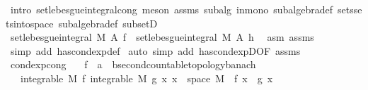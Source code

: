 \begin{isabellebody}
\ {\isacharparenleft}{\kern0pt}intro\ set{\isacharunderscore}{\kern0pt}lebesgue{\isacharunderscore}{\kern0pt}integral{\isacharunderscore}{\kern0pt}cong{\isacharparenright}{\kern0pt}\ {\isacharparenleft}{\kern0pt}meson\ assms{\isacharparenleft}{\kern0pt}{}{\isacharparenright}{\kern0pt}\ subalg\ in{\isacharunderscore}{\kern0pt}mono\ subalgebra{\isacharunderscore}{\kern0pt}def\ sets{\isachardot}{\kern0pt}sets{\isacharunderscore}{\kern0pt}into{\isacharunderscore}{\kern0pt}space\ subalgebra{\isacharunderscore}{\kern0pt}def\ subsetD{\isacharparenright}{\kern0pt}{\isacharplus}{\kern0pt}\isanewline
\ \ \isamarkupfalse%
\ {\isachardoublequoteopen}set{\isacharunderscore}{\kern0pt}lebesgue{\isacharunderscore}{\kern0pt}integral\ M\ A\ f\ {\isacharequal}{\kern0pt}\ set{\isacharunderscore}{\kern0pt}lebesgue{\isacharunderscore}{\kern0pt}integral\ M\ A\ h{\isachardoublequoteclose}\ \isamarkupfalse%
\ asm\ assms{\isacharparenleft}{\kern0pt}{}{\isacharparenright}{\kern0pt}\ \isamarkupfalse%
\ {\isacharparenleft}{\kern0pt}simp\ add{\isacharcolon}{\kern0pt}\ has{\isacharunderscore}{\kern0pt}cond{\isacharunderscore}{\kern0pt}exp{\isacharunderscore}{\kern0pt}def{\isacharparenright}{\kern0pt}\isanewline
{}\isamarkupfalse%
\ {\isacharparenleft}{\kern0pt}auto\ simp\ add{\isacharcolon}{\kern0pt}\ has{\isacharunderscore}{\kern0pt}cond{\isacharunderscore}{\kern0pt}expD{\isacharbrackleft}{\kern0pt}OF\ assms{\isacharparenleft}{\kern0pt}{}{\isacharparenright}{\kern0pt}{\isacharbrackright}{\kern0pt}{\isacharparenright}{\kern0pt}%
\endisatagproof
{\isafoldproof}%
%
\isadelimproof
\isanewline
%
\endisadelimproof
\isanewline
{}\isamarkupfalse%
\ cond{\isacharunderscore}{\kern0pt}exp{\isacharunderscore}{\kern0pt}cong{\isacharcolon}{\kern0pt}\isanewline
\ \ \ f\ {\isacharcolon}{\kern0pt}{\isacharcolon}{\kern0pt}\ {\isachardoublequoteopen}{\isacharprime}{\kern0pt}a\ {\isasymRightarrow}\ {\isacharprime}{\kern0pt}b{\isacharcolon}{\kern0pt}{\isacharcolon}{\kern0pt}{\isacharbraceleft}{\kern0pt}second{\isacharunderscore}{\kern0pt}countable{\isacharunderscore}{\kern0pt}topology{\isacharcomma}{\kern0pt}banach{\isacharbraceright}{\kern0pt}{\isachardoublequoteclose}\isanewline
\ \ \ {\isachardoublequoteopen}integrable\ M\ f{\isachardoublequoteclose}\ {\isachardoublequoteopen}integrable\ M\ g{\isachardoublequoteclose}\ {\isachardoublequoteopen}{\isasymAnd}x{\isachardot}{\kern0pt}\ x\ {\isasymin}\ space\ M\ {\isasymLongrightarrow}\ f\ x\ {\isacharequal}{\kern0pt}\ g\ x{\isachardoublequoteclose}\isanewline

\end{isabellebody}

